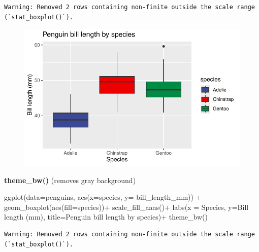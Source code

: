 \documentclass[
  letterpaper,
  DIV=11,
  numbers=noendperiod]{scrartcl}
\newenvironment{Shaded}{\begin{snugshade}}{\end{snugshade}}
\newcommand{\AttributeTok}[1]{\textcolor[rgb]{0.40,0.45,0.13}{#1}}
\newcommand{\FunctionTok}[1]{\textcolor[rgb]{0.28,0.35,0.67}{#1}}
\newcommand{\NormalTok}[1]{\textcolor[rgb]{0.00,0.23,0.31}{#1}}
\newcommand{\SpecialCharTok}[1]{\textcolor[rgb]{0.37,0.37,0.37}{#1}}
\newcommand{\StringTok}[1]{\textcolor[rgb]{0.13,0.47,0.30}{#1}}
\begin{document}
\begin{verbatim}
Warning: Removed 2 rows containing non-finite outside the scale range
(`stat_boxplot()`).
\end{verbatim}

\begin{figure}[H]

{\centering \includegraphics{Lab_2_files/figure-pdf/unnamed-chunk-41-1.pdf}

}

\end{figure}

\textbf{theme\_bw()} (removes gray background)

\begin{Shaded}
\begin{Highlighting}[]
\FunctionTok{ggplot}\NormalTok{(}\AttributeTok{data=}\NormalTok{penguins, }\FunctionTok{aes}\NormalTok{(}\AttributeTok{x=}\NormalTok{species, }\AttributeTok{y=}\NormalTok{ bill\_length\_mm)) }\SpecialCharTok{+}
  \FunctionTok{geom\_boxplot}\NormalTok{(}\FunctionTok{aes}\NormalTok{(}\AttributeTok{fill=}\NormalTok{species))}\SpecialCharTok{+}
  \FunctionTok{scale\_fill\_aaas}\NormalTok{()}\SpecialCharTok{+}
  \FunctionTok{labs}\NormalTok{(}\AttributeTok{x =} \StringTok{\textquotesingle{}Species\textquotesingle{}}\NormalTok{, }\AttributeTok{y=}\StringTok{\textquotesingle{}Bill length (mm)\textquotesingle{}}\NormalTok{, }\AttributeTok{title=}\StringTok{\textquotesingle{}Penguin bill length by species\textquotesingle{}}\NormalTok{)}\SpecialCharTok{+}
  \FunctionTok{theme\_bw}\NormalTok{()}
\end{Highlighting}
\end{Shaded}

\begin{verbatim}
Warning: Removed 2 rows containing non-finite outside the scale range
(`stat_boxplot()`).
\end{verbatim}
\end{document}
